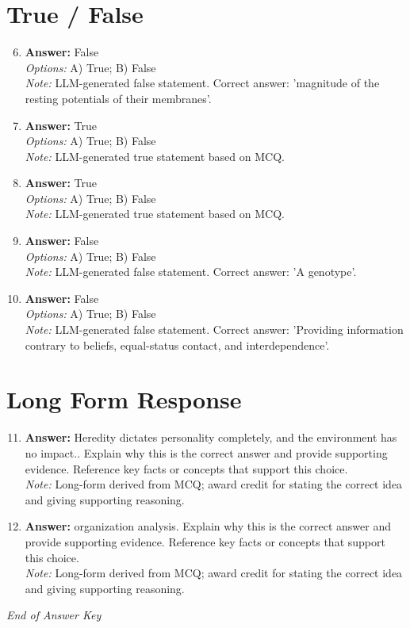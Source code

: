 \documentclass[12pt]{article}
\begin{document}
\section*{True / False}
\begin{enumerate}[label=\arabic*.]
\setcounter{enumi}{5}
\item \textbf{Answer:} False
\\ \textit{Options:} A) True; B) False
\\ \textit{Note:} LLM-generated false statement. Correct answer: 'magnitude of the resting potentials of their membranes'.
\item \textbf{Answer:} True
\\ \textit{Options:} A) True; B) False
\\ \textit{Note:} LLM-generated true statement based on MCQ.
\item \textbf{Answer:} True
\\ \textit{Options:} A) True; B) False
\\ \textit{Note:} LLM-generated true statement based on MCQ.
\item \textbf{Answer:} False
\\ \textit{Options:} A) True; B) False
\\ \textit{Note:} LLM-generated false statement. Correct answer: 'A genotype'.
\item \textbf{Answer:} False
\\ \textit{Options:} A) True; B) False
\\ \textit{Note:} LLM-generated false statement. Correct answer: 'Providing information contrary to beliefs, equal-status contact, and interdependence'.
\end{enumerate}

\section*{Long Form Response}
\begin{enumerate}[label=\arabic*.]
\setcounter{enumi}{10}
\item \textbf{Answer:} Heredity dictates personality completely, and the environment has no impact.. Explain why this is the correct answer and provide supporting evidence. Reference key facts or concepts that support this choice.
\\ \textit{Note:} Long-form derived from MCQ; award credit for stating the correct idea and giving supporting reasoning.
\item \textbf{Answer:} organization analysis. Explain why this is the correct answer and provide supporting evidence. Reference key facts or concepts that support this choice.
\\ \textit{Note:} Long-form derived from MCQ; award credit for stating the correct idea and giving supporting reasoning.
\end{enumerate}

\vfill
\noindent\textit{End of Answer Key}
\end{document}
